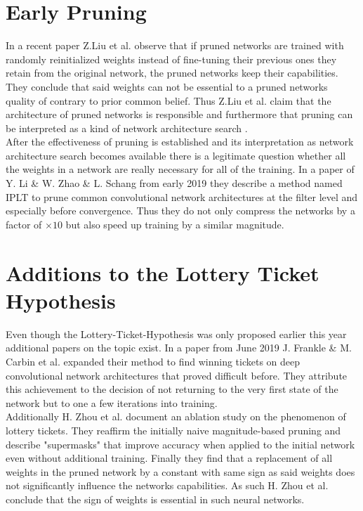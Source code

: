 \section{Early Pruning}
In a recent paper \cite{Rethinking-Network-Pruning} Z.Liu et al. observe that if pruned networks are trained with randomly reinitialized weights instead of fine-tuning their previous ones they retain from the original network, the pruned networks keep their capabilities. They conclude that said weights can not be essential to a pruned networks quality of contrary to prior common belief. Thus Z.Liu et al. claim that the architecture of pruned networks is responsible and furthermore that pruning can be interpreted as a kind of network architecture search .\\
After the effectiveness of pruning is established and its interpretation as network architecture search becomes available there is a legitimate question whether all the weights in a network are really necessary for all of the training. In a paper of Y. Li \& W. Zhao \& L. Schang from early 2019 \cite{Pruning-With-Little-Training} they describe a method named IPLT to prune common convolutional network architectures at the filter level and especially before convergence. Thus they do not only compress the networks by a factor of $\times10$ but also speed up training by a similar magnitude. 

\section{Additions to the Lottery Ticket Hypothesis}
Even though the Lottery-Ticket-Hypothesis was only proposed earlier this year additional papers on the topic exist.
In a paper from June 2019 J. Frankle \& M. Carbin et al. \cite{LTH-At-Scale} expanded their method to find winning tickets on deep convolutional network architectures that proved difficult before. They attribute this achievement to the decision of not returning to the very first state of the network but to one a few iterations into training.\\
Additionally H. Zhou et al. \cite{Deconstructing_LTH} document an ablation study on the phenomenon of lottery tickets. They reaffirm the initially naive magnitude-based pruning and describe "supermasks" that improve accuracy when applied to the initial network even without additional training. Finally they find that a replacement of all weights in the pruned network by a constant with same sign as said weights does not significantly influence the networks capabilities. As such H. Zhou et al. conclude that the sign of weights is essential in such neural networks. 


